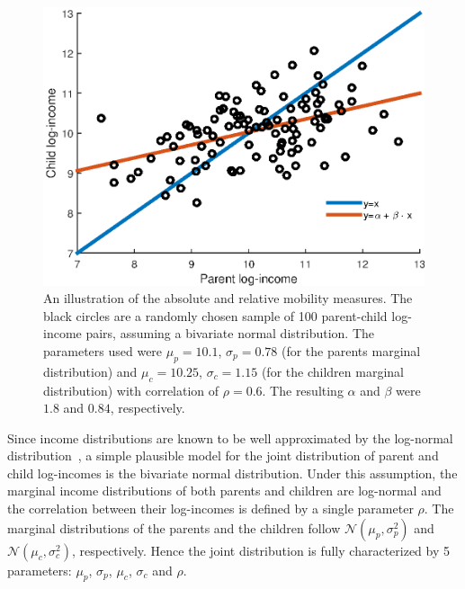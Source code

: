 \documentclass[12pt,a4paper]{article}
\newcommand{\flabel}[1]{\label{fig:#1}}
\numberwithin{equation}{section}
\begin{document}
\begin{figure}[!htb]
\centering
\includegraphics[width=1.0\textwidth]{./figs/bivariate_lines3.eps}
\caption{An illustration of the absolute and relative mobility measures. The black circles are a randomly chosen sample of 100 parent-child log-income pairs, assuming a bivariate normal distribution. The parameters used were $\mu_p=10.1$, $\sigma_p=0.78$ (for the parents marginal distribution) and $\mu_c=10.25$, $\sigma_c=1.15$ (for the children marginal distribution) with correlation of $\rho=0.6$. The resulting $\alpha$ and $\beta$ were $1.8$ and $0.84$, respectively.}
\flabel{lines}
\end{figure}

Since income distributions are known to be well approximated by the log-normal distribution~\citep{pinkovskiy2009parametric}, a simple plausible model for the joint distribution of parent and child log-incomes is the bivariate normal distribution. Under this assumption, the marginal income distributions of both parents and children are log-normal and the correlation between their log-incomes is defined by a single parameter $\rho$. The marginal distributions of the parents and the children follow $\mathcal{N}\left(\mu_p,\sigma_p^2\right)$ and $\mathcal{N}\left(\mu_c,\sigma_c^2\right)$, respectively. Hence the joint distribution is fully characterized by 5 parameters: $\mu_p$, $\sigma_p$, $\mu_c$, $\sigma_c$ and $\rho$.
\end{document}
